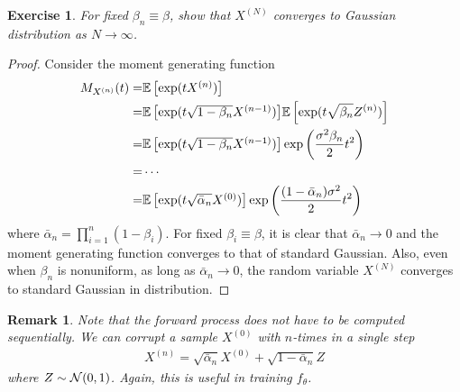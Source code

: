 \documentclass[11pt, a4paper]{article}
\newtheorem{exercise}{Exercise}
\newtheorem{remark}{Remark}
\begin{document}
\begin{exercise}
    For fixed $\beta_n\equiv \beta$, show that $X^{(N)}$ converges to Gaussian distribution as $N\rightarrow \infty$.
\end{exercise}
\begin{proof}
    Consider the moment generating function
    \begin{align}
        M_{X^{(n)}}(t) =& \Expec{\exp(t X^{(n)})}\\
        =& \Expec{\exp(t \sqrt{1-\beta_n} X^{(n-1)})} \Expec{\exp(t \sqrt{\beta_n}Z^{(n)})}\\
        =& \Expec{\exp(t \sqrt{1-\beta_n}X^{(n-1)})} \exp\left(\frac{\sigma^2\beta_n}{2}t^2\right)\\
        =& \cdots \\
        =& \Expec{\exp(t \sqrt{\bar{\alpha}_n} X^{(0)})} \exp\left(\frac{(1-\bar{\alpha}_n)\sigma^2}{2}t^2\right)
    \end{align}
    where $\bar{\alpha}_n = \prod_{i=1}^n (1-\beta_i)$.
    For fixed $\beta_i\equiv \beta$, it is clear that $\bar{\alpha}_n \rightarrow 0$ and the moment generating function
    converges to that of standard Gaussian.
    Also, even when $\beta_n$ is nonuniform, as long as $\bar{\alpha}_n\rightarrow 0$, the random variable $X^{(N)}$ converges to standard Gaussian in distribution.
\end{proof}

\begin{remark}
    Note that the forward process does not have to be computed sequentially.
    We can corrupt a sample $X^{(0)}$ with $n$-times in a single step
    \begin{align}
        X^{(n)} = \sqrt{\bar{\alpha}_n} X^{(0)} + \sqrt{1-\bar{\alpha}_n} Z
    \end{align}
    where $Z\sim{\cal N}(0, 1)$.
    Again, this is useful in training $f_\theta$.
\end{remark}
\end{document}

